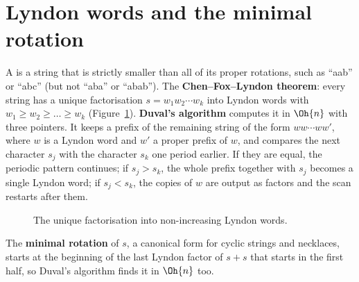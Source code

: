 \section[Lyndon words and the minimal rotation]{Lyndon words and the minimal rotation \hfill \ioi}\label{sec:lyndon}

A  is a string that is strictly smaller than all of its proper rotations, such as ``aab'' or ``abc'' (but not ``aba'' or
``abab''). The \textbf{Chen--Fox--Lyndon theorem}: every string has a unique factorisation $s = w_1 w_2 \cdots w_k$ into Lyndon words with
$w_1 \ge w_2 \ge \dots \ge w_k$ (Figure~\ref{fig:lyndon}). \textbf{Duval's algorithm} computes it in $\Oh{n}$ with three pointers. It keeps a
prefix of the remaining string of the form $w w \cdots w w'$, where $w$ is a Lyndon word and $w'$ a proper prefix of $w$, and compares the
next character $s_j$ with the character $s_k$ one period earlier. If they are equal, the periodic pattern continues; if $s_j > s_k$, the
whole prefix together with $s_j$ becomes a single Lyndon word; if $s_j < s_k$, the copies of $w$ are output as factors and the scan
restarts after them.

\begin{figure}[htbp]
\centering
{}
\caption{The unique factorisation into non-increasing Lyndon words.}
\label{fig:lyndon}
\end{figure}

The \textbf{minimal rotation} of $s$, a canonical form for cyclic strings and necklaces, starts at the beginning of the last Lyndon factor
of $s + s$ that starts in the first half, so Duval's algorithm finds it in $\Oh{n}$ too.

